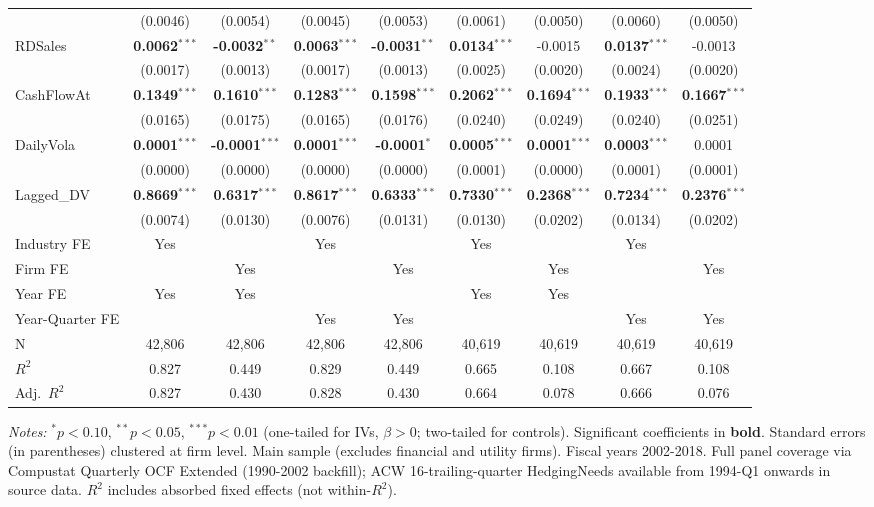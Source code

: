 \documentclass[11pt,a4paper]{article}
\begin{document}
\begin{table}[htbp]
\begin{tabular}{lcccccccc}
 & (0.0046) & (0.0054) & (0.0045) & (0.0053) & (0.0061) & (0.0050) & (0.0060) & (0.0050) \\
RDSales & \textbf{0.0062}$^{***}$ & \textbf{-0.0032}$^{**}$ & \textbf{0.0063}$^{***}$ & \textbf{-0.0031}$^{**}$ & \textbf{0.0134}$^{***}$ & -0.0015 & \textbf{0.0137}$^{***}$ & -0.0013 \\
 & (0.0017) & (0.0013) & (0.0017) & (0.0013) & (0.0025) & (0.0020) & (0.0024) & (0.0020) \\
CashFlowAt & \textbf{0.1349}$^{***}$ & \textbf{0.1610}$^{***}$ & \textbf{0.1283}$^{***}$ & \textbf{0.1598}$^{***}$ & \textbf{0.2062}$^{***}$ & \textbf{0.1694}$^{***}$ & \textbf{0.1933}$^{***}$ & \textbf{0.1667}$^{***}$ \\
 & (0.0165) & (0.0175) & (0.0165) & (0.0176) & (0.0240) & (0.0249) & (0.0240) & (0.0251) \\
DailyVola & \textbf{0.0001}$^{***}$ & \textbf{-0.0001}$^{***}$ & \textbf{0.0001}$^{***}$ & \textbf{-0.0001}$^{*}$ & \textbf{0.0005}$^{***}$ & \textbf{0.0001}$^{***}$ & \textbf{0.0003}$^{***}$ & 0.0001 \\
 & (0.0000) & (0.0000) & (0.0000) & (0.0000) & (0.0001) & (0.0000) & (0.0001) & (0.0001) \\
Lagged\_DV & \textbf{0.8669}$^{***}$ & \textbf{0.6317}$^{***}$ & \textbf{0.8617}$^{***}$ & \textbf{0.6333}$^{***}$ & \textbf{0.7330}$^{***}$ & \textbf{0.2368}$^{***}$ & \textbf{0.7234}$^{***}$ & \textbf{0.2376}$^{***}$ \\
 & (0.0074) & (0.0130) & (0.0076) & (0.0131) & (0.0130) & (0.0202) & (0.0134) & (0.0202) \\
\midrule
Industry FE & Yes &  & Yes &  & Yes &  & Yes &  \\
Firm FE &  & Yes &  & Yes &  & Yes &  & Yes \\
Year FE & Yes & Yes &  &  & Yes & Yes &  &  \\
Year-Quarter FE &  &  & Yes & Yes &  &  & Yes & Yes \\
\midrule
N & 42,806 & 42,806 & 42,806 & 42,806 & 40,619 & 40,619 & 40,619 & 40,619 \\
$R^2$ & 0.827 & 0.449 & 0.829 & 0.449 & 0.665 & 0.108 & 0.667 & 0.108 \\
Adj.~$R^2$ & 0.827 & 0.430 & 0.828 & 0.430 & 0.664 & 0.078 & 0.666 & 0.076 \\
\bottomrule
\end{tabular}
\begin{minipage}{\linewidth}
\vspace{2pt}\scriptsize
\textit{Notes:} $^{*}p<0.10$, $^{**}p<0.05$, $^{***}p<0.01$ (one-tailed for IVs, $\beta > 0$; two-tailed for controls).
 Significant coefficients in \textbf{bold}.
 Standard errors (in parentheses) clustered at firm level.
 Main sample (excludes financial and utility firms). Fiscal years 2002-2018. Full panel coverage via Compustat Quarterly OCF Extended (1990-2002 backfill); ACW 16-trailing-quarter HedgingNeeds available from 1994-Q1 onwards in source data.
 $R^2$ includes absorbed fixed effects (not within-$R^2$).
\end{minipage}
\end{table}
\end{document}
